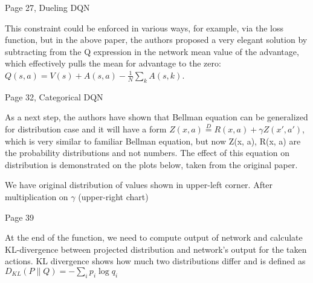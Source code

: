 Page 27, Dueling DQN

This constraint could be enforced in various ways, for example, via the loss
function, but in the above paper, the authors proposed a very elegant solution
by subtracting from the Q expression in the network mean value of the advantage,
which effectively pulls the mean for advantage to the zero:
\begin{math}Q(s, a) = V(s) + A(s, a) - \frac{1}{N}\sum_kA(s,k)\end{math}.

Page 32, Categorical DQN

As a next step, the authors have shown that Bellman equation can be generalized for
distribution case and it will have a form
\begin{math}Z(x, a)\stackrel{D}{=} R(x, a) + \gamma Z(x', a')\end{math}, which
is very similar to familiar Bellman equation, but now Z(x, a), R(x, a) are the
probability distributions and not numbers. The effect of this equation on
distribution is demonstrated on the plots below, taken from the original paper.

We have original distribution of values shown in upper-left corner. After
multiplication on \begin{math}\gamma\end{math} (upper-right chart)

Page 39

At the end of the function, we need to compute output of network and calculate
KL-divergence between projected distribution and network’s output for the taken
actions. KL divergence shows how much two distributions differ and is defined as
\begin{math}D_{KL}(P\|Q) = -\sum_i p_i\log q_i\end{math}
  

